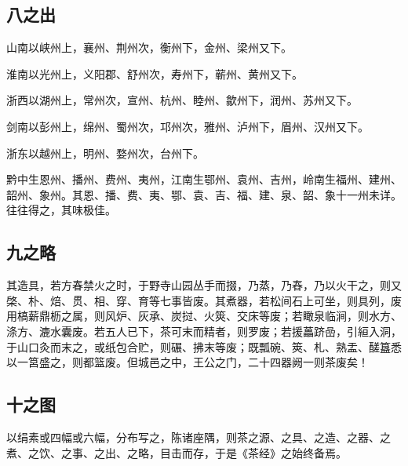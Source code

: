 \documentclass[]{article}
\begin{document}
\hypertarget{header-n29}{%
\subsection{八之出}\label{header-n29}}

山南以峡州上，襄州、荆州次，衡州下，金州、梁州又下。

淮南以光州上，义阳郡、舒州次，寿州下，蕲州、黄州又下。

浙西以湖州上，常州次，宣州、杭州、睦州、歙州下，润州、苏州又下。

剑南以彭州上，绵州、蜀州次，邛州次，雅州、泸州下，眉州、汉州又下。

浙东以越州上，明州、婺州次，台州下。

黔中生恩州、播州、费州、夷州，江南生鄂州、袁州、吉州，岭南生福州、建州、韶州、象州。其恩、播、费、夷、鄂、袁、吉、福、建、泉、韶、象十一州未详。往往得之，其味极佳。

\hypertarget{header-n30}{%
\subsection{九之略}\label{header-n30}}

其造具，若方春禁火之时，于野寺山园丛手而掇，乃蒸，乃舂，乃以火干之，则又棨、朴、焙、贯、相、穿、育等七事皆废。其煮器，若松间石上可坐，则具列，废用槁薪鼎枥之属，则风炉、灰承、炭挝、火筴、交床等废；若瞰泉临涧，则水方、涤方、漉水囊废。若五人已下，茶可末而精者，则罗废；若援藟跻嵒，引絙入洞，于山口灸而末之，或纸包合贮，则碾、拂末等废；既瓢碗、筴、札、熟盂、醝簋悉以一筥盛之，则都篮废。但城邑之中，王公之门，二十四器阙一则茶废矣！

\hypertarget{header-n31}{%
\subsection{十之图}\label{header-n31}}

以绢素或四幅或六幅，分布写之，陈诸座隅，则茶之源、之具、之造、之器、之煮、之饮、之事、之出、之略，目击而存，于是《茶经》之始终备焉。
\end{document}
